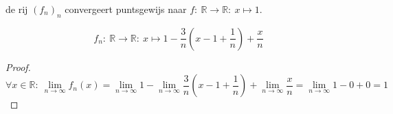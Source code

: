 \documentclass[main.tex]{subfiles}
\begin{document}
\begin{vb}
  de rij $(f_{n})_{n}$ convergeert puntsgewijs naar $f:\ \mathbb{R} \rightarrow \mathbb{R}:\ x \mapsto 1$.

  \noindent
  \begin{minipage}{.45\textwidth}
    \begin{figure}[H]
      \centering
    \end{figure}
  \end{minipage}
  \begin{minipage}{.45\textwidth}
  \[ f_{n}:\ \mathbb{R} \rightarrow \mathbb{R}:\ x \mapsto 1- \frac{3}{n}\left(x-1+\frac{1}{n}\right) + \frac{x}{n} \]
  \end{minipage}

  \begin{proof}
    \[ \forall x\in \mathbb{R}:\ \lim_{n\rightarrow\infty}f_{n}(x)
    = \lim_{n\rightarrow\infty}1- \lim_{n\rightarrow\infty}\frac{3}{n}\left(x-1+\frac{1}{n}\right) + \lim_{n\rightarrow\infty}\frac{x}{n}
    = \lim_{n\rightarrow\infty}1 - 0 + 0
    = 1 \]
  \end{proof}
\end{vb}
\end{document}
